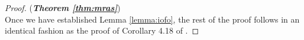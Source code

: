 \begin{proof}(\textbf{\textit{Theorem \ref{thm:mras}}})\ \\
Once we have established Lemma \ref{lemma:iofo}, the rest of the proof follows in an identical fashion as the proof of Corollary 4.18 of \cite{chang2013simulation}.
\end{proof}
